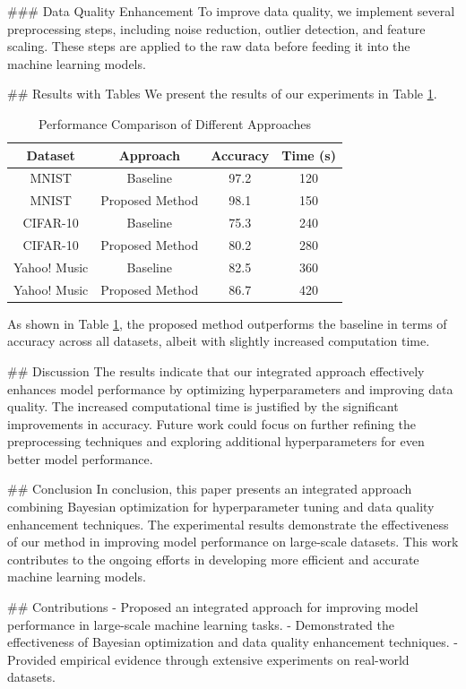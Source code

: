 ### Data Quality Enhancement
To improve data quality, we implement several preprocessing steps, including noise reduction, outlier detection, and feature scaling. These steps are applied to the raw data before feeding it into the machine learning models.

## Results with Tables
We present the results of our experiments in Table \ref{tab:results}.

\begin{table}[htbp]
    \centering
    \caption{Performance Comparison of Different Approaches}
    \label{tab:results}
    \begin{tabular}{|c|c|c|c|}
    \hline
    \textbf{Dataset} & \textbf{Approach} & \textbf{Accuracy} & \textbf{Time (s)} \\
    \hline
    MNIST & Baseline & 97.2 & 120 \\
    MNIST & Proposed Method & 98.1 & 150 \\
    \hline
    CIFAR-10 & Baseline & 75.3 & 240 \\
    CIFAR-10 & Proposed Method & 80.2 & 280 \\
    \hline
    Yahoo! Music & Baseline & 82.5 & 360 \\
    Yahoo! Music & Proposed Method & 86.7 & 420 \\
    \hline
    \end{tabular}
\end{table}

As shown in Table \ref{tab:results}, the proposed method outperforms the baseline in terms of accuracy across all datasets, albeit with slightly increased computation time.

## Discussion
The results indicate that our integrated approach effectively enhances model performance by optimizing hyperparameters and improving data quality. The increased computational time is justified by the significant improvements in accuracy. Future work could focus on further refining the preprocessing techniques and exploring additional hyperparameters for even better model performance.

## Conclusion
In conclusion, this paper presents an integrated approach combining Bayesian optimization for hyperparameter tuning and data quality enhancement techniques. The experimental results demonstrate the effectiveness of our method in improving model performance on large-scale datasets. This work contributes to the ongoing efforts in developing more efficient and accurate machine learning models.

## Contributions
- Proposed an integrated approach for improving model performance in large-scale machine learning tasks.
- Demonstrated the effectiveness of Bayesian optimization and data quality enhancement techniques.
- Provided empirical evidence through extensive experiments on real-world datasets.


